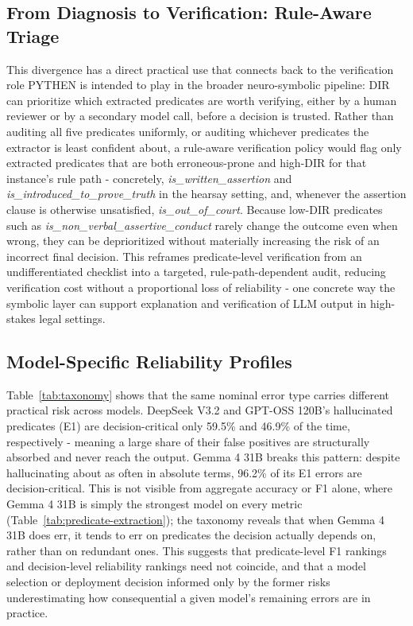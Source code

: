 \subsection{From Diagnosis to Verification: Rule-Aware Triage}
\label{subsec:triage}
This divergence has a direct practical use that connects back to the verification role PYTHEN is intended to play in the broader neuro-symbolic pipeline: DIR can prioritize which extracted predicates are worth verifying, either by a human reviewer or by a secondary model call, before a decision is trusted. Rather than auditing all five predicates uniformly, or auditing whichever predicates the extractor is least confident about, a rule-aware verification policy would flag only extracted predicates that are both erroneous-prone and high-DIR for that instance's rule path - concretely, \textit{is\_written\_assertion} and \textit{is\_introduced\_to\_prove\_truth} in the hearsay setting, and, whenever the assertion clause is otherwise unsatisfied, \textit{is\_out\_of\_court}. Because low-DIR predicates such as \textit{is\_non\_verbal\_assertive\_conduct} rarely change the outcome even when wrong, they can be deprioritized without materially increasing the risk of an incorrect final decision. This reframes predicate-level verification from an undifferentiated checklist into a targeted, rule-path-dependent audit, reducing verification cost without a proportional loss of reliability - one concrete way the symbolic layer can support explanation and verification of LLM output in high-stakes legal settings.

\subsection{Model-Specific Reliability Profiles}
\label{subsec:model-differences}
Table~\ref{tab:taxonomy} shows that the same nominal error type carries different practical risk across models. DeepSeek V3.2 and GPT-OSS 120B's hallucinated predicates (E1) are decision-critical only 59.5\% and 46.9\% of the time, respectively - meaning a large share of their false positives are structurally absorbed and never reach the output. Gemma 4 31B breaks this pattern: despite hallucinating about as often in absolute terms, 96.2\% of its E1 errors are decision-critical. This is not visible from aggregate accuracy or F1 alone, where Gemma 4 31B is simply the strongest model on every metric (Table~\ref{tab:predicate-extraction}); the taxonomy reveals that when Gemma 4 31B does err, it tends to err on predicates the decision actually depends on, rather than on redundant ones. This suggests that predicate-level F1 rankings and decision-level reliability rankings need not coincide, and that a model selection or deployment decision informed only by the former risks underestimating how consequential a given model's remaining errors are in practice.

